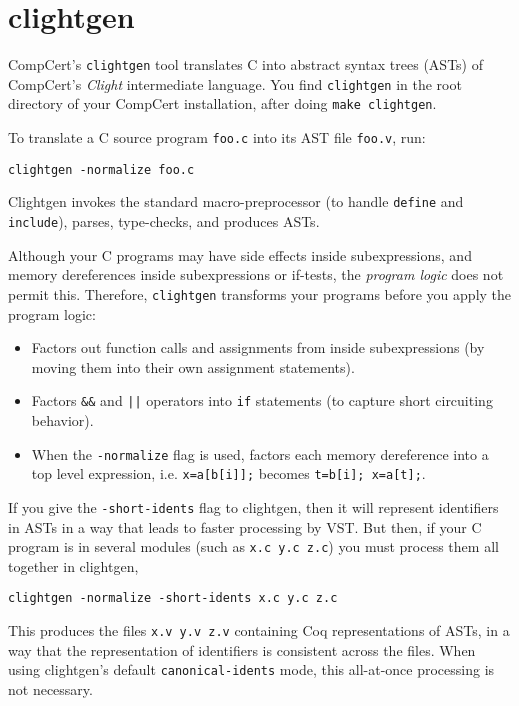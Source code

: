 \documentclass[12pt,fleqn,openany,oneside,showtrims]{memoir}
\begin{document}
\chapter{\textsf{clightgen}}
\label{refcard:clightgen}

CompCert's \lstinline{clightgen} tool
translates C into
abstract syntax trees (ASTs) of
CompCert's \emph{Clight} intermediate language.
You find \lstinline{clightgen} in the root directory of your CompCert installation, after doing \lstinline{make clightgen}.

To translate a C source program \lstinline{foo.c} into its AST file \lstinline{foo.v},
run:
\begin{lstlisting}
clightgen -normalize foo.c
\end{lstlisting}
\vspace{-\baselineskip}

Clightgen invokes the standard macro-preprocessor (to handle
\lstinline{define} and \lstinline{include}),
parses, type-checks, and produces ASTs.

Although your C programs may have side effects inside subexpressions,
and memory dereferences inside subexpressions or if-tests,
the \emph{program logic} does not permit this.  Therefore,
\lstinline{clightgen} transforms your programs
before you apply the program logic:
\begin{itemize}
\item Factors out function calls and assignments from inside subexpressions (by moving them into their own assignment statements).
\item Factors \lstinline{&&} and \lstinline{||} operators
      into \lstinline{if} statements (to capture
  short circuiting behavior).
\item When the \lstinline{-normalize} flag is used,
  factors each memory dereference into a top level expression,
  i.e. \lstinline{x=a[b[i]];} becomes \lstinline{t=b[i]; x=a[t];}.
\end{itemize}

  If you give the \lstinline{-short-idents} flag
to clightgen, then it will represent
identifiers in ASTs in a way that leads to faster processing by VST.
But then, if your C program is in several modules 
(such as \lstinline{x.c y.c z.c}) you must process them all together
in clightgen,
\begin{lstlisting}
clightgen -normalize -short-idents x.c y.c z.c
\end{lstlisting}
\vspace{-\baselineskip}
This produces the files \lstinline{x.v y.v z.v} containing Coq representations of ASTs,
in a way that the representation of identifiers is consistent across the files.
When using clightgen's default \lstinline{canonical-idents} mode,
this all-at-once processing is not necessary.
\end{document}

